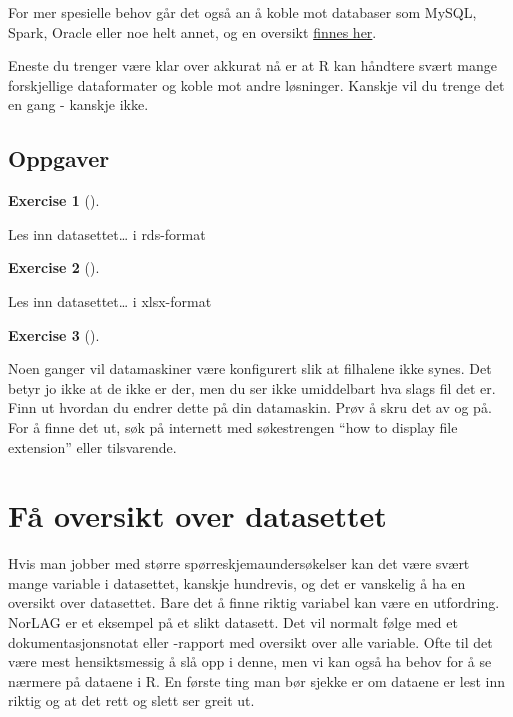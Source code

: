 \documentclass[
  letterpaper,
  DIV=11,
  numbers=noendperiod]{scrreprt}
\theoremstyle{definition}
\newtheorem{exercise}{Exercise}[chapter]
\theoremstyle{remark}
\begin{document}
For mer spesielle behov går det også an å koble mot databaser som MySQL,
Spark, Oracle eller noe helt annet, og en oversikt
\href{https://cran.r-project.org/web/views/Databases.html}{finnes her}.

Eneste du trenger være klar over akkurat nå er at R kan håndtere svært
mange forskjellige dataformater og koble mot andre løsninger. Kanskje
vil du trenge det en gang - kanskje ikke.

\hypertarget{oppgaver-1}{%
\section{Oppgaver}\label{oppgaver-1}}

\leavevmode{}%
\begin{exercise}[]\label{exr-}

Les inn datasettet\ldots{} i rds-format

\end{exercise}

\leavevmode{}%
\begin{exercise}[]\label{exr-}

Les inn datasettet\ldots{} i xlsx-format

\end{exercise}

\leavevmode{}%
\begin{exercise}[]\label{exr-}

Noen ganger vil datamaskiner være konfigurert slik at filhalene ikke
synes. Det betyr jo ikke at de ikke er der, men du ser ikke umiddelbart
hva slags fil det er. Finn ut hvordan du endrer dette på din datamaskin.
Prøv å skru det av og på. For å finne det ut, søk på internett med
søkestrengen ``how to display file extension'' eller tilsvarende.

\end{exercise}

\hypertarget{fuxe5-oversikt-over-datasettet}{%
\chapter{Få oversikt over
datasettet}\label{fuxe5-oversikt-over-datasettet}}

Hvis man jobber med større spørreskjemaundersøkelser kan det være svært
mange variable i datasettet, kanskje hundrevis, og det er vanskelig å ha
en oversikt over datasettet. Bare det å finne riktig variabel kan være
en utfordring. NorLAG er et eksempel på et slikt datasett. Det vil
normalt følge med et dokumentasjonsnotat eller -rapport med oversikt
over alle variable. Ofte til det være mest hensiktsmessig å slå opp i
denne, men vi kan også ha behov for å se nærmere på dataene i R. En
første ting man bør sjekke er om dataene er lest inn riktig og at det
rett og slett ser greit ut.
\end{document}
